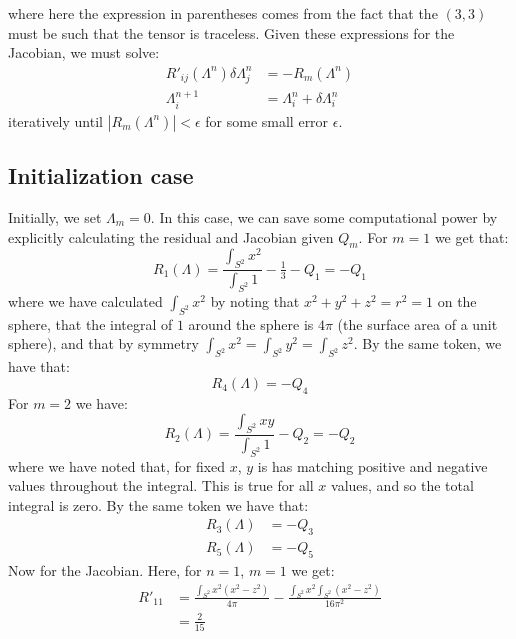 \documentclass[reqno]{article}
\begin{document}
	where here the expression in parentheses comes from the fact that the $(3, 3)$ must be such that the tensor is traceless.
	Given these expressions for the Jacobian, we must solve:
	\begin{align}
	R'_{ij} (\Lambda^n) \delta \Lambda^n_j &= -R_m (\Lambda^n) \\
	\Lambda^{n + 1}_{i} &= \Lambda^n_{i} + \delta \Lambda^n_i
	\end{align}
	iteratively until $\left| R_m (\Lambda^n) \right| < \epsilon$ for some small error $\epsilon$.
	
	\subsection{Initialization case}
	Initially, we set $\Lambda_{m} = 0$.
	In this case, we can save some computational power by explicitly calculating the residual and Jacobian given $Q_m$.
	For $m = 1$ we get that:
	\begin{equation}
		R_1 (\Lambda)
		= \frac{\int_{S^2} x^2}{\int_{S^2} 1}
		- \tfrac13 - Q_1
		= -Q_1
	\end{equation}
	where we have calculated $\int_{S^2} x^2$ by noting that $x^2 + y^2 + z^2 = r^2 = 1$ on the sphere, that the integral of $1$ around the sphere is $4\pi$ (the surface area of a unit sphere), and that by symmetry $\int_{S^2} x^2 = \int_{S^2} y^2 = \int_{S^2} z^2$.
	By the same token, we have that:
	\begin{equation}
		R_4 (\Lambda) = -Q_4
	\end{equation}
	For $m = 2$ we have:
	\begin{equation}
		R_2 (\Lambda)
		= \frac{\int_{S^2} xy}{\int_{S^2} 1} - Q_2
		= -Q_2
	\end{equation}
	where we have noted that, for fixed $x$, $y$ is has matching positive and negative values throughout the integral.
	This is true for all $x$ values, and so the total integral is zero.
	By the same token we have that:
	\begin{align}
		R_3(\Lambda) &= -Q_3 \\
		R_5(\Lambda) &= -Q_5
	\end{align}
	Now for the Jacobian.
	Here, for $n = 1$, $m = 1$ we get:
	\begin{equation}
	\begin{split}
		R'_{11} 
		&=
		\frac{\int_{S^2} x^2 (x^2 - z^2)}{4\pi}
		- \frac{\int_{S^2} x^2 \int_{S^2} (x^2 - z^2)}{16 \pi^2} \\
		&= \frac{2}{15}
	\end{split}
	\end{equation}
\end{document}
